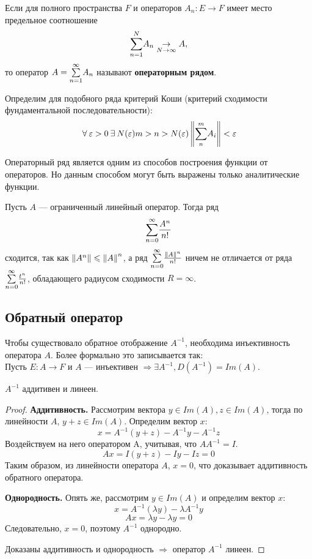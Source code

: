 \documentclass[12pt]{article}
\begin{document}
	\begin{defi}
		Если для полного пространства $F$ и операторов $A_n : E \rightarrow F$ имеет место предельное соотношение
		$$\underset{n=1}{\overset{N}{\sum}} A_n \underset{N \rightarrow \infty}{\rightarrow} A,$$
		то оператор $A = \underset{n=1}{\overset{\infty}{\sum}} A_n$ называют \textbf{операторным рядом}.
	\end{defi}
	
	Определим для подобного ряда критерий Коши (критерий сходимости фундаментальной последовательности):
	$$\forall \varepsilon > 0 \exists N(\varepsilon) m > n > N(\varepsilon) \norm{ \Sum{n}{m} A_i } < \varepsilon$$
	
	Операторный ряд является одним из способов построения функции от операторов. Но данным способом могут быть выражены только 
	аналитические функции.
	
	\example Пусть $A$ --- ограниченный линейный оператор. Тогда ряд 
	$$\underset{n = 0}{\overset{\infty}{\sum}} \frac{A^n}{n!}$$
	сходится, так как $\left\| A^n \right\| \leqslant \left\| A \right\|^n$, а ряд $\underset{n=0}{\overset{\infty}{\sum}} \frac{\left\| A \right\|^n}{n!}$ ничем не отличается от ряда
	$\underset{n=0}{\overset{\infty}{\sum}} \frac{t^n}{n!}$, обладающего радиусом сходимости $R = \infty$.
	
	\subsection{Обратный оператор}
	
	Чтобы существовало обратное отображение $A^{-1}$, необходима инъективность оператора $A$. Более формально это записывается так: \\
	Пусть $E : A \rightarrow F$ и $A$ --- инъективен $\Rightarrow \exists A^{-1}, D(A^{-1}) = Im(A)$.
	
	\begin{state}
		$A^{-1}$ аддитивен и линеен.
	\end{state}
	\begin{proof}
		\textbf{Аддитивность.} Рассмотрим вектора $y \in Im(A), z \in Im(A)$, тогда по линейности $A$, $y + z \in Im(A)$.
		Определим вектор $x$:
		$$x = A^{-1}(y + z) - A^{-1} y - A^{-1} z$$
		Воздействуем на него оператором A, учитывая, что $A A^{-1} = I$.
		$$Ax = I(y + z) - I y - I z = 0$$
		Таким образом, из линейности оператора $A$, $x = 0$, что доказывает аддитивность обратного оператора.
		
		\textbf{Однородность.} Опять же, рассмотрим $y \in Im(A)$ и определим вектор $x$:
		$$ x = A^{-1}(\lambda y) - \lambda A^{-1} y $$
		$$ Ax = \lambda y - \lambda y = 0 $$
		Следовательно, $x = 0$, поэтому $A^{-1}$ однородно.
		
		Доказаны аддитивность и однородность $\Rightarrow$ оператор $A^{-1}$ линеен.
	\end{proof}
	
\end{document}

